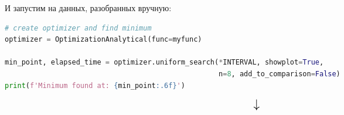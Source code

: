 \documentclass[a4paper, 14pt]{extarticle}
\begin{document}
И запустим на данных, разобранных вручную:

\begin{center}
    \begin{lstlisting}[language=Python]
# create optimizer and find minimum
optimizer = OptimizationAnalytical(func=myfunc)

min_point, elapsed_time = optimizer.uniform_search(*INTERVAL, showplot=True, 
                                                   n=8, add_to_comparison=False)
print(f'Minimum found at: {min_point:.6f}')
    \end{lstlisting}
\end{center}

\vfill

\begin{equation*}
    \scalebox{1.5}{
        $\downarrow$
    }
\end{equation*}

\vfill\newpage
\end{document}
